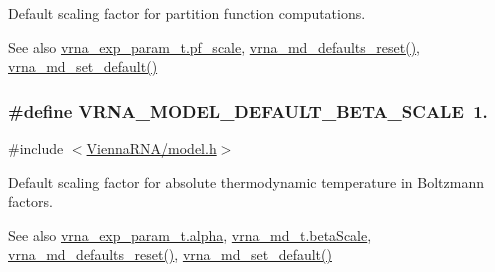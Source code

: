 Default scaling factor for partition function computations. 

\begin{DoxySeeAlso}{See also}
\hyperlink{group__energy__parameters_a53c12f0d74f94ce371e0471a8ab5a377}{vrna\+\_\+exp\+\_\+param\+\_\+t.\+pf\+\_\+scale}, \hyperlink{group__model__details_ga70834424cf804d149937de89f80ceb45}{vrna\+\_\+md\+\_\+defaults\+\_\+reset()}, \hyperlink{group__model__details_ga8ac6ff84936282436f822644bf841f66}{vrna\+\_\+md\+\_\+set\+\_\+default()} 
\end{DoxySeeAlso}
\subsubsection[{\texorpdfstring{V\+R\+N\+A\+\_\+\+M\+O\+D\+E\+L\+\_\+\+D\+E\+F\+A\+U\+L\+T\+\_\+\+B\+E\+T\+A\+\_\+\+S\+C\+A\+LE}{VRNA_MODEL_DEFAULT_BETA_SCALE}}]{\setlength{\rightskip}{0pt plus 5cm}\#define V\+R\+N\+A\+\_\+\+M\+O\+D\+E\+L\+\_\+\+D\+E\+F\+A\+U\+L\+T\+\_\+\+B\+E\+T\+A\+\_\+\+S\+C\+A\+LE~1.}\hypertarget{group__model__details_ga383d3ac8d08c3b6221754b50871c1200}{}\label{group__model__details_ga383d3ac8d08c3b6221754b50871c1200}


{\ttfamily \#include $<$\hyperlink{model_8h}{Vienna\+R\+N\+A/model.\+h}$>$}



Default scaling factor for absolute thermodynamic temperature in Boltzmann factors. 

\begin{DoxySeeAlso}{See also}
\hyperlink{group__energy__parameters_a77145830b7bb01b36c3217b363310ef0}{vrna\+\_\+exp\+\_\+param\+\_\+t.\+alpha}, \hyperlink{structvrna__md__s_a19524bf1d8d7ab590ed36edbbcaaba2c}{vrna\+\_\+md\+\_\+t.\+beta\+Scale}, \hyperlink{group__model__details_ga70834424cf804d149937de89f80ceb45}{vrna\+\_\+md\+\_\+defaults\+\_\+reset()}, \hyperlink{group__model__details_ga8ac6ff84936282436f822644bf841f66}{vrna\+\_\+md\+\_\+set\+\_\+default()} 
\end{DoxySeeAlso}
